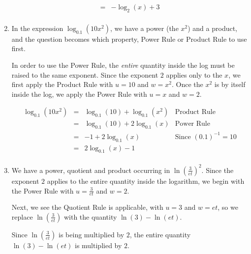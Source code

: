 \begin{ex}
\begin{enumerate}
\[\begin{array}{rclr}
& = & - \log_{2}(x) + 3 & \\

\end{array}\]

\setlength{\extrarowheight}{2pt}

\item   In the expression $\log_{0.1} \left(10 x^2 \right)$, we have a power (the $x^2$) and a product, and the question becomes which property, Power Rule or Product Rule to use first.

\smallskip

In order to use the Power Rule, the \textit{entire} quantity inside the log must be raised to the same exponent.  Since the exponent $2$ applies only to the $x$, we first apply the Product Rule with $u=10$ and $w=x^2$.  Once  the $x^2$ is by itself inside the log, we apply the Power Rule with $u=x$ and $w=2$.

\setlength{\extrarowheight}{6pt}
\[ \begin{array}{rclr}
\log_{0.1} \left(10 x^2 \right) & = &  \log_{0.1} (10) +  \log_{0.1} \left(x^2 \right) & \mbox{Product Rule} \\
                                & = &  \log_{0.1} (10)+ 2 \log_{0.1} (x) & \mbox{Power Rule} \\
                                & = &  -1 + 2 \log_{0.1} (x) & \mbox{Since $(0.1)^{-1} = 10$} \\
                                & = &  2 \log_{0.1} (x) - 1 & \\
                              
\end{array}\]
\setlength{\extrarowheight}{2pt}


\item  We have a power, quotient and product occurring in $\ln \left(\frac{3}{et}\right)^2$.  Since the exponent $2$ applies to the entire quantity inside the logarithm, we begin with the Power Rule with $u=\frac{3}{et}$ and $w = 2$.  

\smallskip

Next, we see the Quotient Rule is applicable, with $u=3$ and $w=et$, so we replace $\ln\left(\frac{3}{et}\right)$  with the quantity $\ln(3) - \ln(et)$. 

\smallskip

Since $\ln \left(\frac{3}{et}\right)$ is being multiplied by $2$, the entire quantity $\ln(3) - \ln(et)$ is multiplied by $2$.  

\smallskip


\end{enumerate}
\end{ex}
